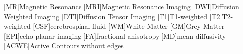 [MR]{Magnetic Resonance}
[MRI]{Magnetic Resonance Imaging}
[DWI]{Diffusion Weighted Imaging}
[DTI]{Diffusion Tensor Imaging}
[T1]{T1-weighted}
[T2]{T2-weighted}
[CSF]{cerebrospinal fluid}
[WM]{White Matter}
[GM]{Grey Matter}
[EPI]{echo-planar imaging}
[FA]{fractional anisotropy}
[MD]{mean diffusivity}
[ACWE]{Active Contours without edges}